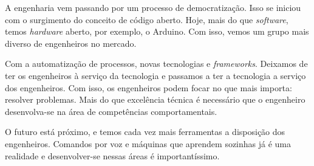 \documentclass[
	12pt,				%
	openright,			%
	oneside,			%
	a4paper,			%
    tikz,
	english,			%
	french,				%
	spanish,			%
	brazil				%
	]{abntex2}
\begin{document}
A engenharia vem passando por um processo de democratização.
Isso se iniciou com o surgimento do conceito de código aberto.
Hoje, mais do que \textit{software}, temos \textit{hardware} aberto,
por exemplo, o Arduino. Com isso, vemos um grupo mais diverso
de engenheiros no mercado.

\par

Com a automatização de processos, novas tecnologias e
\textit{frameworks}. Deixamos de ter os engenheiros à serviço
da tecnologia e passamos a ter a tecnologia a serviço dos
engenheiros. Com isso, os engenheiros podem focar no que mais
importa: resolver problemas. Mais do que excelência
técnica é necessário que o engenheiro desenvolva-se na área
de competências comportamentais.

\par
O futuro está próximo, e temos cada vez mais ferramentas a disposição
dos engenheiros. Comandos por voz e máquinas que aprendem sozinhas
já é uma realidade e desenvolver-se nessas áreas é importantíssimo.


\end{document}
